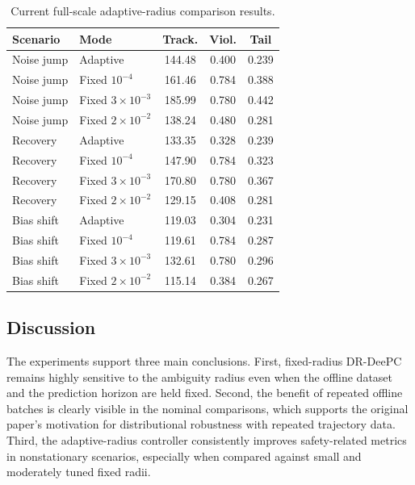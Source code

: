 \documentclass[conference]{IEEEtran}
\begin{document}
\begin{table}[t]
    \centering
    \caption{Current full-scale adaptive-radius comparison results.}
    \label{tab:adaptive-summary}
    \begin{tabular}{llccc}
        \toprule
        Scenario & Mode & Track. & Viol. & Tail \\
        \midrule
        Noise jump & Adaptive & 144.48 & 0.400 & 0.239 \\
        Noise jump & Fixed $10^{-4}$ & 161.46 & 0.784 & 0.388 \\
        Noise jump & Fixed $3\!\times\!10^{-3}$ & 185.99 & 0.780 & 0.442 \\
        Noise jump & Fixed $2\!\times\!10^{-2}$ & 138.24 & 0.480 & 0.281 \\
        \midrule
        Recovery & Adaptive & 133.35 & 0.328 & 0.239 \\
        Recovery & Fixed $10^{-4}$ & 147.90 & 0.784 & 0.323 \\
        Recovery & Fixed $3\!\times\!10^{-3}$ & 170.80 & 0.780 & 0.367 \\
        Recovery & Fixed $2\!\times\!10^{-2}$ & 129.15 & 0.408 & 0.281 \\
        \midrule
        Bias shift & Adaptive & 119.03 & 0.304 & 0.231 \\
        Bias shift & Fixed $10^{-4}$ & 119.61 & 0.784 & 0.287 \\
        Bias shift & Fixed $3\!\times\!10^{-3}$ & 132.61 & 0.780 & 0.296 \\
        Bias shift & Fixed $2\!\times\!10^{-2}$ & 115.14 & 0.384 & 0.267 \\
        \bottomrule
    \end{tabular}
\end{table}

\subsection{Discussion}
The experiments support three main conclusions. First, fixed-radius DR-DeePC remains highly sensitive to the ambiguity radius even when the offline dataset and the prediction horizon are held fixed. Second, the benefit of repeated offline batches is clearly visible in the nominal comparisons, which supports the original paper's motivation for distributional robustness with repeated trajectory data. Third, the adaptive-radius controller consistently improves safety-related metrics in nonstationary scenarios, especially when compared against small and moderately tuned fixed radii.
\end{document}
